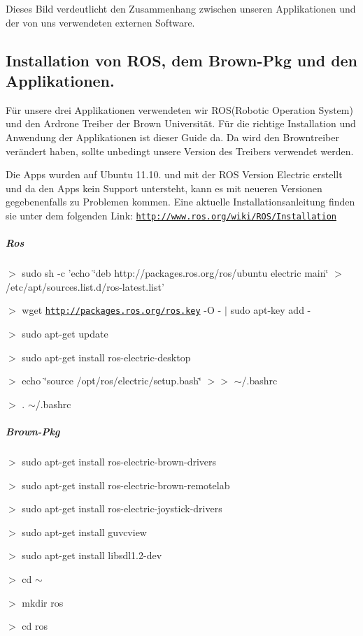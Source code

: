 Dieses Bild verdeutlicht den Zusammenhang zwischen unseren Applikationen und der von uns verwendeten externen Software.

\subsection*{Installation von ROS, dem Brown-\/Pkg und den Applikationen. }

Für unsere drei Applikationen verwendeten wir ROS(Robotic Operation System) und den Ardrone Treiber der Brown Universität. Für die richtige Installation und Anwendung der Applikationen ist dieser Guide da. Da wird den Browntreiber verändert haben, sollte unbedingt unsere Version des Treibers verwendet werden.

Die Apps wurden auf Ubuntu 11.10. und mit der ROS Version Electric erstellt und da den Apps kein Support untersteht, kann es mit neueren Versionen gegebenenfalls zu Problemen kommen. Eine aktuelle Installationsanleitung finden sie unter dem folgenden Link: \href{http://www.ros.org/wiki/ROS/Installation}{\tt http://www.ros.org/wiki/ROS/Installation}

\subparagraph*{Ros }

$>$ sudo sh -\/c 'echo \char`\"{}deb http://packages.ros.org/ros/ubuntu electric main\char`\"{} $>$ /etc/apt/sources.list.d/ros-\/latest.list'

$>$ wget \href{http://packages.ros.org/ros.key}{\tt http://packages.ros.org/ros.key} -\/O -\/ $|$ sudo apt-\/key add -\/

$>$ sudo apt-\/get update

$>$ sudo apt-\/get install ros-\/electric-\/desktop

$>$ echo \char`\"{}source /opt/ros/electric/setup.bash\char`\"{} $>$$>$ $\sim$/.bashrc

$>$ . $\sim$/.bashrc

\subparagraph*{Brown-\/Pkg }

$>$ sudo apt-\/get install ros-\/electric-\/brown-\/drivers

$>$ sudo apt-\/get install ros-\/electric-\/brown-\/remotelab

$>$ sudo apt-\/get install ros-\/electric-\/joystick-\/drivers

$>$ sudo apt-\/get install guvcview

$>$ sudo apt-\/get install libsdl1.2-\/dev

$>$ cd $\sim$

$>$ mkdir ros

$>$ cd ros


